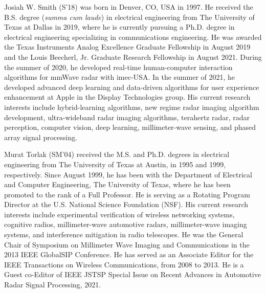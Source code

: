 \documentclass{ieeeaccess}
\begin{document}
\begin{IEEEbiography}{Josiah W. Smith} (S'18) was born in Denver, CO, USA in 1997. He received the B.S. degree (\textit{summa cum laude}) in electrical engineering from The University of Texas at Dallas in 2019, where he is currently pursuing a Ph.D. degree in electrical engineering specializing in communications engineering. He was awarded the Texas Instruments Analog Excellence Graduate Fellowship in August 2019 and the Louis Beecherl, Jr. Graduate Research Fellowship in August 2021. During the summer of 2020, he developed real-time human-computer interaction algorithms for mmWave radar with imec-USA. In the summer of 2021, he developed advanced deep learning and data-driven algorithms for user experience enhancement at Apple in the Display Technologies group. His current research interests include hybrid-learning algorithms, new regime radar imaging algorithm development, ultra-wideband radar imaging algorithms, terahertz radar, radar perception, computer vision, deep learning, millimeter-wave sensing, and phased array signal processing.
\end{IEEEbiography}

\begin{IEEEbiography}{Murat Torlak} (SM’04) received the M.S. and Ph.D. degrees in electrical engineering from The University of Texas at Austin, in 1995 and 1999, respectively. Since August 1999, he has been with the Department of Electrical and Computer Engineering, The University of Texas, where he has been promoted to the rank of a Full Professor. He is serving as a Rotating Program Director at the U.S. National Science Foundation (NSF). His current research interests include experimental verification of wireless networking systems, cognitive radios, millimeter-wave automotive radars, millimeter-wave imaging systems, and interference mitigation in radio telescopes. He was the General Chair of Symposium on Millimeter Wave Imaging and Communications in the 2013 IEEE GlobalSIP Conference. He has served as an Associate Editor for the IEEE Transactions on Wireless Communications, from 2008 to 2013. He is a Guest co-Editor of IEEE JSTSP Special Issue on Recent Advances in Automotive Radar Signal Processing, 2021.
\end{IEEEbiography}

\EOD
\end{document}
